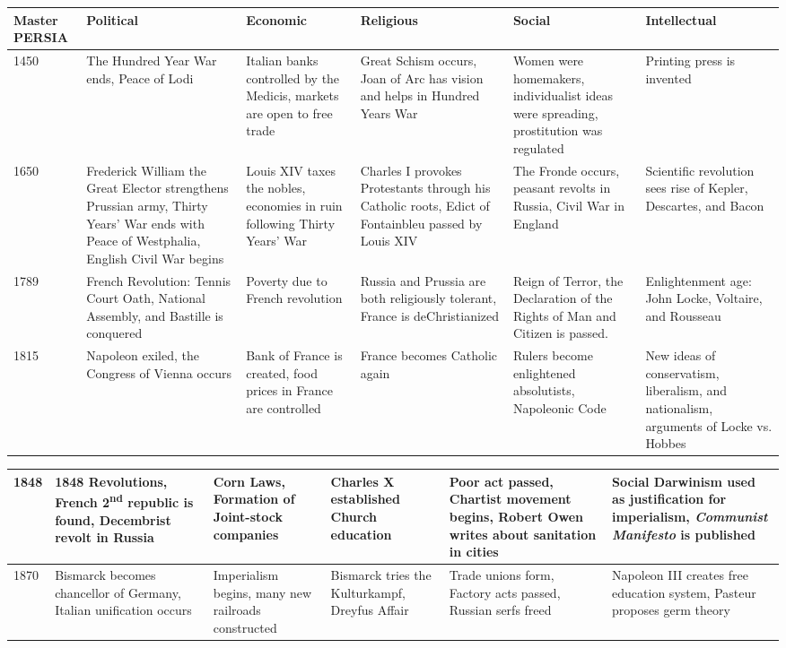 \documentclass[12pt]{article}
\begin{document}
\begin{enumerate}
\begin{tabular}{|p{}|p{}|p{}|p{}|p{}|p{}|}
\hline
Master PERSIA & Political & Economic & Religious & Social & Intellectual\\
\hline
1450 & The Hundred Year War ends, Peace of Lodi & Italian banks controlled by the Medicis, markets are open to free trade & Great Schism occurs, Joan of Arc has vision and helps in Hundred Years War & Women were homemakers, individualist ideas were spreading, prostitution was regulated & Printing press is invented \\
\hline
1650 & Frederick William the Great Elector strengthens Prussian army, Thirty Years' War ends with Peace of Westphalia, English Civil War begins & Louis XIV taxes the nobles, economies in ruin following Thirty Years' War & Charles I provokes Protestants through his Catholic roots, Edict of Fontainbleu passed by Louis XIV & The Fronde occurs, peasant revolts in Russia, Civil War in England & Scientific revolution sees rise of Kepler, Descartes, and Bacon \\
\hline
1789 & French Revolution: Tennis Court Oath, National Assembly, and Bastille is conquered & Poverty due to French revolution & Russia and Prussia are both religiously tolerant, France is deChristianized & Reign of Terror, the Declaration of the Rights of Man and Citizen is passed. & Enlightenment age: John Locke, Voltaire, and Rousseau  \\
\hline
1815 & Napoleon exiled, the Congress of Vienna occurs & Bank of France is created, food prices in France are controlled & France becomes Catholic again & Rulers become enlightened absolutists, Napoleonic Code & New ideas of conservatism, liberalism, and nationalism, arguments of Locke vs. Hobbes \\
\hline
\end{tabular}
\newpage
\hspace{-40pt} \begin{tabular}{|p{}|p{}|p{}|p{}|p{}|p{}|}
\hline
1848 & 1848 Revolutions, French 2\textsuperscript{nd} republic is found, Decembrist revolt in Russia  & Corn Laws, Formation of Joint-stock companies  & Charles X established Church education & Poor act passed, Chartist movement begins, Robert Owen writes about sanitation in cities & Social Darwinism used as justification for imperialism, \textit{Communist Manifesto} is published \\
\hline
1870 & Bismarck becomes chancellor of Germany, Italian unification occurs  & Imperialism begins, many new railroads constructed  & Bismarck tries the Kulturkampf, Dreyfus Affair & Trade unions form, Factory acts passed, Russian serfs freed  & Napoleon III creates free education system, Pasteur proposes germ theory \\

\end{tabular}
\end{enumerate}
\end{document}
